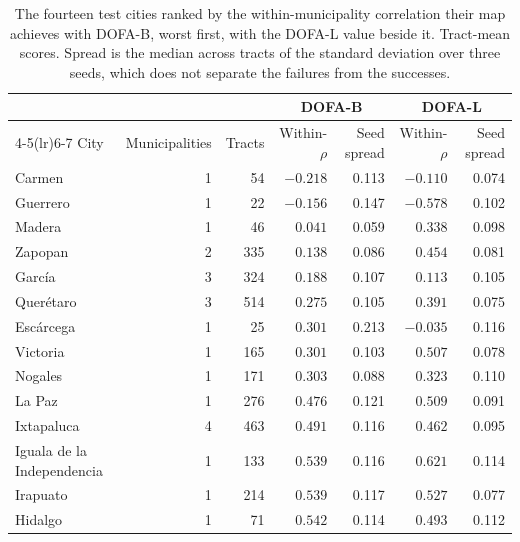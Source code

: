 \begin{table}[htbp]
\centering
\caption{The fourteen test cities ranked by the within-municipality correlation their map achieves with DOFA-B, worst first, with the DOFA-L value beside it. Tract-mean scores. Spread is the median across tracts of the standard deviation over three seeds, which does not separate the failures from the successes.}
\small
\begin{tabular}{lrrrrrr}
\toprule
 & & & \multicolumn{2}{c}{DOFA-B} & \multicolumn{2}{c}{DOFA-L}\\
\cmidrule(lr){4-5}\cmidrule(lr){6-7}
City & Municipalities & Tracts & Within-$\rho$ & Seed spread & Within-$\rho$ & Seed spread\\
\midrule
Carmen & 1 & 54 & $-0.218$ & 0.113 & $-0.110$ & 0.074\\
Guerrero & 1 & 22 & $-0.156$ & 0.147 & $-0.578$ & 0.102\\
Madera & 1 & 46 & $0.041$ & 0.059 & $0.338$ & 0.098\\
Zapopan & 2 & 335 & $0.138$ & 0.086 & $0.454$ & 0.081\\
García & 3 & 324 & $0.188$ & 0.107 & $0.113$ & 0.105\\
Querétaro & 3 & 514 & $0.275$ & 0.105 & $0.391$ & 0.075\\
Escárcega & 1 & 25 & $0.301$ & 0.213 & $-0.035$ & 0.116\\
Victoria & 1 & 165 & $0.301$ & 0.103 & $0.507$ & 0.078\\
Nogales & 1 & 171 & $0.303$ & 0.088 & $0.323$ & 0.110\\
La Paz & 1 & 276 & $0.476$ & 0.121 & $0.509$ & 0.091\\
Ixtapaluca & 4 & 463 & $0.491$ & 0.116 & $0.462$ & 0.095\\
Iguala de la Independencia & 1 & 133 & $0.539$ & 0.116 & $0.621$ & 0.114\\
Irapuato & 1 & 214 & $0.539$ & 0.117 & $0.527$ & 0.077\\
Hidalgo & 1 & 71 & $0.542$ & 0.114 & $0.493$ & 0.112\\
\bottomrule
\end{tabular}
\label{tab:audit}
\end{table}
